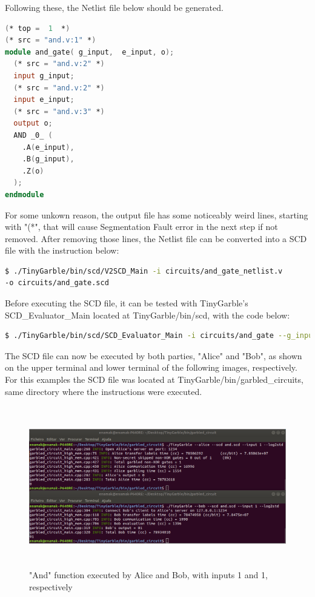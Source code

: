 \begin{refsection}
Following these, the Netlist file below should be generated.

\begin{lstlisting}[caption={and\_gate\_netlist.v}, language=Verilog, captionpos=b]
(* top =  1  *)
(* src = "and.v:1" *)
module and_gate( g_input,  e_input, o);
  (* src = "and.v:2" *)
  input g_input;
  (* src = "and.v:2" *)
  input e_input;
  (* src = "and.v:3" *)
  output o;
  AND _0_ (
    .A(e_input),
    .B(g_input),
    .Z(o)
  );
endmodule
\end{lstlisting}

For some unkown reason, the output file has some noticeably weird lines, starting with "(*", that will cause Segmentation Fault error in the next step if not removed.
After removing those lines, the Netlist file can be converted into a SCD file with the instruction below:

\begin{lstlisting}[caption={Installation of Yosys-abc}, language=bash, captionpos=b]
$ ./TinyGarble/bin/scd/V2SCD_Main -i circuits/and_gate_netlist.v
-o circuits/and_gate.scd		
\end{lstlisting}

Before executing the SCD file, it can be tested with TinyGarble's SCD\_Evaluator\_Main located at TinyGarble/bin/scd, with the code below:

\begin{lstlisting}[caption={Testing a SCD file}, language=bash, captionpos=b]
$ ./TinyGarble/bin/scd/SCD_Evaluator_Main -i circuits/and_gate --g_input 1 --e_input 0
\end{lstlisting}

\newpage

The SCD file can now be executed by both parties, "Alice" and "Bob", as shown on the upper terminal and lower terminal of the following images, respectively.
For this examples the SCD file was located at TinyGarble/bin/garbled\_circuits, same directory where the instructions were executed.

\begin{figure}[H]
	\centering
	\includegraphics[width=1\textwidth, height=7cm]{./sdf/secure_multiparty_computation/figures/tinygarble_and_a.png}
    \caption{"And" function executed by Alice and Bob, with inputs 1 and 1, respectively}\label{fig:tinygarble_and_a}
\end{figure}


\end{refsection}
